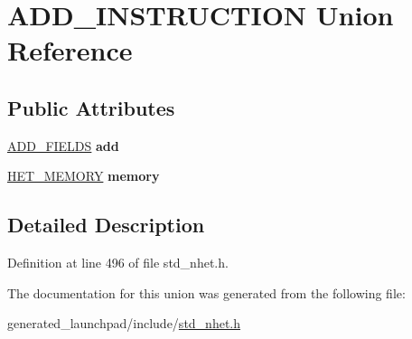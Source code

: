 \hypertarget{unionADD__INSTRUCTION}{}\section{A\+D\+D\+\_\+\+I\+N\+S\+T\+R\+U\+C\+T\+I\+ON Union Reference}
\label{unionADD__INSTRUCTION}
\subsection*{Public Attributes}
\begin{DoxyCompactItemize}
\item 
\mbox{\label{unionADD__INSTRUCTION_afc6170422cf972dab669caaa5cb327a6}} 
\mbox{\hyperlink{structADD__format}{A\+D\+D\+\_\+\+F\+I\+E\+L\+DS}} {\bfseries add}
\item 
\mbox{\label{unionADD__INSTRUCTION_a9230c9b828e5411921ceef782059f679}} 
\mbox{\hyperlink{structmemory__format}{H\+E\+T\+\_\+\+M\+E\+M\+O\+RY}} {\bfseries memory}
\end{DoxyCompactItemize}


\subsection{Detailed Description}


Definition at line 496 of file std\+\_\+nhet.\+h.



The documentation for this union was generated from the following file\+:\begin{DoxyCompactItemize}
\item 
generated\+\_\+launchpad/include/\mbox{\hyperlink{std__nhet_8h}{std\+\_\+nhet.\+h}}\end{DoxyCompactItemize}
